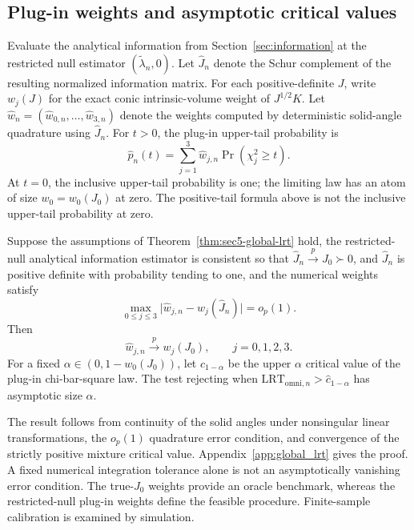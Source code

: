 \subsection{Plug-in weights and asymptotic critical values}
\label{subsec:global_plugin}
Evaluate the analytical information from Section~\ref{sec:information}
at the restricted null estimator $(\widetilde\lambda_n,0)$.
Let $\widehat J_n$ denote the Schur complement of the resulting
normalized information matrix. For each positive-definite $J$,
write $w_j(J)$ for the exact conic intrinsic-volume weight of
$J^{1/2}K$. Let
$\widehat w_n=(\widehat w_{0,n},\ldots,\widehat w_{3,n})$
denote the weights computed by deterministic solid-angle quadrature
using $\widehat J_n$.
For $t>0$, the plug-in upper-tail probability is
\begin{equation}\label{eq:sec5-plugin-p}
 \widehat p_n(t)=
 \sum_{j=1}^{3}\widehat w_{j,n}
 \Pr(\chi_j^2\geq t).
\end{equation}
At $t=0$, the inclusive upper-tail probability is one; the limiting
law has an atom of size $w_0=w_0(J_0)$ at zero. The positive-tail
formula above is not the inclusive upper-tail probability at zero.

\begin{proposition}\label{prop:sec5-plugin-validity}
Suppose the assumptions of Theorem~\ref{thm:sec5-global-lrt}
hold, the restricted-null analytical information estimator is
consistent so that $\widehat J_n\xrightarrow{p}J_0\succ0$, and
$\widehat J_n$ is positive definite with probability tending to one,
and the numerical weights satisfy
\begin{equation}\label{eq:sec5-numerical-error}
 \max_{0\leq j\leq3}
 \bigl|\widehat w_{j,n}-w_j(\widehat J_n)\bigr|
 =o_p(1).
\end{equation}
Then
\[
 \widehat w_{j,n}\xrightarrow{p}w_j(J_0),
 \qquad j=0,1,2,3.
\]
For a fixed $\alpha\in(0,1-w_0(J_0))$, let
$\widehat c_{1-\alpha}$ be the upper $\alpha$ critical value of
the plug-in chi-bar-square law. The test rejecting when
$\mathrm{LRT}_{\mathrm{omni},n}>\widehat c_{1-\alpha}$ has asymptotic size
$\alpha$.
\end{proposition}

The result follows from continuity of the solid angles under
nonsingular linear transformations, the $o_p(1)$ quadrature error
condition, and convergence of the strictly positive mixture
critical value. Appendix~\ref{app:global_lrt} gives the proof.
A fixed numerical integration tolerance alone is not an
asymptotically vanishing error condition. The true-$J_0$ weights
provide an oracle benchmark, whereas the restricted-null plug-in
weights define the feasible procedure. Finite-sample calibration
is examined by simulation.


